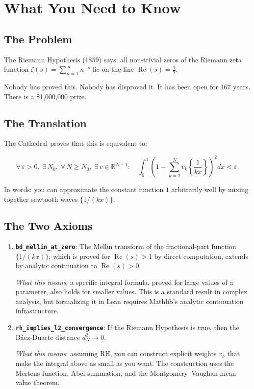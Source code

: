 \documentclass[11pt,a4paper]{article}
\begin{document}
\section*{What You Need to Know}

\subsection*{The Problem}

The Riemann Hypothesis (1859) says: all non-trivial zeros of the
Riemann zeta function $\zeta(s) = \sum_{n=1}^\infty n^{-s}$ lie
on the line $\operatorname{Re}(s) = \frac{1}{2}$.

Nobody has proved this. Nobody has disproved it. It has been open
for 167 years. There is a \$1,000,000 prize.

\subsection*{The Translation}

The Cathedral proves that this is equivalent to:

\[
  \forall\,\varepsilon > 0,\;\exists\,N_0,\;\forall\,N \geq N_0,\;
  \exists\,v \in \mathbb{R}^{N-1}:\quad
  \int_0^1 \left(1 - \sum_{k=2}^N v_k\left\{\frac{1}{kx}\right\}
  \right)^2 dx < \varepsilon.
\]

In words: you can approximate the constant function $1$ arbitrarily
well by mixing together sawtooth waves $\{1/(kx)\}$.

\subsection*{The Two Axioms}

\begin{enumerate}
  \item \textbf{\texttt{bd\_mellin\_at\_zero}}: The Mellin transform
    of the fractional-part function $\{1/(kx)\}$, which is proved
    for $\operatorname{Re}(s) > 1$ by direct computation, extends
    by analytic continuation to $\operatorname{Re}(s) > 0$.

    \emph{What this means}: a specific integral formula, proved for
    large values of a parameter, also holds for smaller values.
    This is a standard result in complex analysis, but formalizing
    it in Lean requires Mathlib's analytic continuation infrastructure.

  \item \textbf{\texttt{rh\_implies\_l2\_convergence}}: If the
    Riemann Hypothesis is true, then the B\'aez-Duarte distance
    $d_N^2 \to 0$.

    \emph{What this means}: assuming RH, you can construct explicit
    weights $v_k$ that make the integral above as small as you want.
    The construction uses the Mertens function, Abel summation, and
    the Montgomery--Vaughan mean value theorem.
\end{enumerate}
\end{document}
